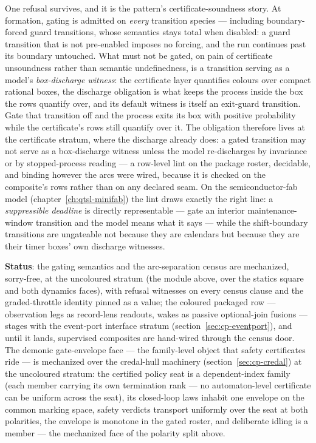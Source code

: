 One refusal survives, and it is the pattern's certificate-soundness
story. At formation, gating is admitted on \emph{every} transition
species --- including boundary-forced guard transitions, whose
semantics stays total when disabled: a guard transition that is not
pre-enabled imposes no forcing, and the run continues past its
boundary untouched. What must not be gated, on pain of
certificate unsoundness rather than semantic undefinedness, is a
transition serving as a model's \emph{box-discharge witness}: the
certificate layer quantifies colours over compact rational boxes, the
discharge obligation is what keeps the process inside the box the
rows quantify over, and its default witness is itself an exit-guard
transition. Gate that transition off and the process exits its box
with positive probability while the certificate's rows still
quantify over it. The obligation therefore lives at the certificate
stratum, where the discharge already does: a gated transition may not
serve as a box-discharge witness unless the model re-discharges by
invariance or by stopped-process reading --- a row-level lint on the
package roster, decidable, and binding however the arcs were wired,
because it is checked on the composite's rows rather than on any
declared seam. On the semiconductor-fab model
(chapter~\ref{ch:qtsl-minifab}) the lint draws exactly the right
line: a \emph{suppressible deadline} is directly representable ---
gate an interior maintenance-window transition and the model means
what it says --- while the shift-boundary transitions are ungateable
not because they are calendars but because they are their timer
boxes' own discharge witnesses.

\textbf{Status}: the gating semantics and the arc-separation census
are mechanized, sorry-free, at the uncoloured stratum (the module
above, over the statics square and both dynamics faces), with refusal
witnesses on every census clause and the graded-throttle identity
pinned as a value; the coloured packaged row --- observation legs as record-lens
readouts, wakes as passive optional-join fusions --- stages with the
event-port interface stratum
(section~\ref{sec:cp-eventport}), and until it lands, supervised
composites are hand-wired through the census door. The demonic
gate-envelope face --- the family-level object that safety
certificates ride --- is mechanized over the credal-hull machinery
(section~\ref{sec:cp-credal}) at the uncoloured stratum: the
certified policy seat is a dependent-index family (each member
carrying its own termination rank --- no automaton-level certificate
can be uniform across the seat), its closed-loop laws inhabit one
envelope on the common marking space, safety verdicts transport
uniformly over the seat at both polarities, the envelope is monotone
in the gated roster, and deliberate idling is a member --- the
mechanized face of the polarity split above.

